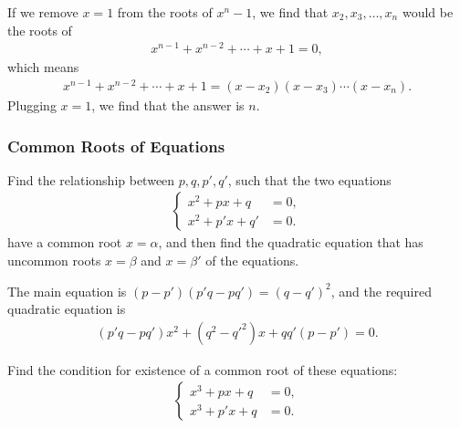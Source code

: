 \begin{solution}
    If we remove $x=1$ from the roots of $x^n-1$, we find that $x_2,x_3,\dots,x_n$ would be the roots of 
    \begin{align*}
        x^{n-1} + x^{n-2} + \cdots + x+ 1 = 0,
    \end{align*}
    which means
    \begin{align*}
        x^{n-1} + x^{n-2} + \cdots + x+ 1 = (x-x_2)(x-x_3)\cdots (x-x_n).
    \end{align*}
    Plugging $x=1$, we find that the answer is $n$.
\end{solution}


\subsubsection{Common Roots of Equations}

\begin{question}
    Find the relationship between $p,q,p',q'$, such that the two equations
    \begin{align*}
        \begin{cases}
            x^2+px+q &= 0,\\x^2+p'x+q' &= 0.
        \end{cases}
    \end{align*}
    have a common root $x=\alpha$, and then find the quadratic equation that has uncommon roots $x=\beta$ and $x=\beta'$ of the equations.
\end{question}

\begin{solution}
    The main equation is $(p-p')(p'q-pq')=(q-q')^2$, and the required quadratic equation is
    \begin{align*}
        (p'q-pq')x^2+(q^2-q'^2)x+qq'(p-p')=0.
    \end{align*}
\end{solution}



\begin{question}
    Find the condition for existence of a common root of these equations:
    \begin{align*}
        \begin{cases}
            x^3+px+q &=0,\\x^3+p'x+q &=0.
        \end{cases}
    \end{align*}
\end{question}


